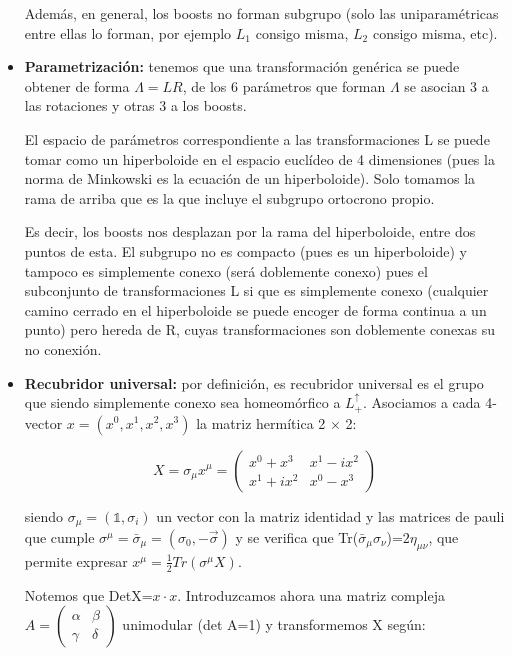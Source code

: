 \documentclass{article}
\begin{document}
\begin{itemize}
\smallskip
Además, en general, los boosts no forman subgrupo (solo las uniparamétricas entre ellas lo forman, por ejemplo $L_1$ consigo misma, $L_2$ consigo misma, etc).

\item \textbf{Parametrización:} tenemos que una transformación genérica se puede obtener de forma $\Lambda =LR$, de los 6 parámetros que forman $\Lambda$ se asocian 3 a las rotaciones y otras 3 a los boosts.

\smallskip
El espacio de parámetros correspondiente a las transformaciones L se puede tomar como un hiperboloide en el espacio euclídeo de 4 dimensiones (pues la norma de Minkowski es la ecuación de un hiperboloide). Solo tomamos la rama de arriba que es la que incluye el subgrupo ortocrono propio.

\smallskip
Es decir, los boosts nos desplazan por la rama del hiperboloide, entre dos puntos de esta. El subgrupo no es compacto (pues es un hiperboloide) y tampoco es simplemente conexo (será doblemente conexo) pues el subconjunto de transformaciones L si que es simplemente conexo (cualquier camino cerrado en el hiperboloide se puede encoger de forma continua a un punto) pero hereda de R, cuyas transformaciones son doblemente conexas su no conexión.

\item\textbf{Recubridor universal:} por definición, es recubridor universal es el grupo que siendo simplemente conexo sea homeomórfico a $L_+^\uparrow$. Asociamos a cada 4-vector $x=(x^0,x^1,x^2,x^3)$ la matriz hermítica 2 $\times$ 2:

$$X=\sigma _\mu x^\mu =\left ( \begin{array}{cc}
     x^0+x^3 & x^1-ix^2 \\
     x^1+ix^2 & x^0-x^3
\end{array}\right)$$

siendo $\sigma _\mu =(\mathds{1},\sigma _i)$ un vector con la matriz identidad y las matrices de pauli que cumple $\sigma ^\mu =\bar{\sigma}_\mu =(\sigma _0 , -\Vec{\sigma})$ y se verifica que Tr($\bar{\sigma}_\mu \sigma _\nu$)=$2\eta _{\mu \nu}$, que permite expresar $x^\mu =\frac{1}{2}Tr(\sigma ^\mu X)$.

Notemos que DetX=$x\cdot x$. Introduzcamos ahora una matriz compleja $A=\left ( \begin{array}{cc}
     \alpha & \beta \\
    \gamma & \delta
\end{array}\right)$ unimodular (det A=1) y transformemos X según:


\end{itemize}
\end{document}
